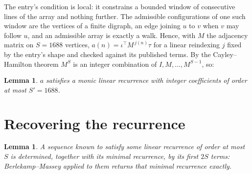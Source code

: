 \documentclass[11pt,a4paper]{article}
\theoremstyle{plain}
\newtheorem{lemma}[theorem]{Lemma}
\theoremstyle{definition}
\begin{document}
The entry's condition is local: it constrains a bounded window of consecutive lines of the
array and nothing further. The admissible configurations of one such window are the vertices
of a finite digraph, an edge joining $u$ to $v$ when $v$ may follow $u$, and an admissible
array is exactly a walk. Hence, with $M$ the adjacency matrix on $S=1688$ vertices,
$a(n)=\iota^{\!\top}M^{\,j(n)}\tau$ for a linear reindexing $j$ fixed by the entry's shape
and checked against its published terms. By the Cayley--Hamilton theorem $M^{S}$ is an
integer combination of $I,M,\dots,M^{S-1}$, so:

\begin{lemma}\label{lem:cf}
$a$ satisfies a monic linear recurrence with integer coefficients of order at most
$S'=1688$.
\end{lemma}

\section{Recovering the recurrence}

\begin{lemma}\label{lem:bm}
A sequence known to satisfy some linear recurrence of order at most $S$ is determined, together
with its minimal recurrence, by its first $2S$ terms: Berlekamp--Massey applied to them returns
that minimal recurrence exactly.
\end{lemma}
\end{document}
